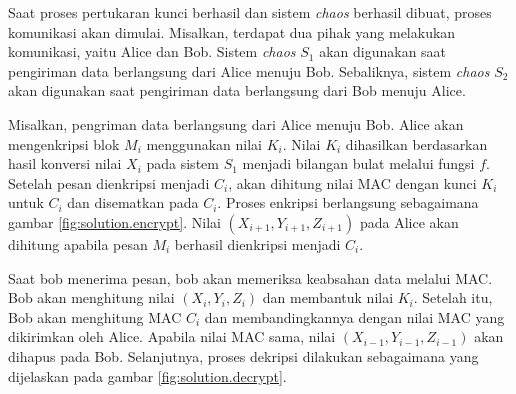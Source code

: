 Saat proses pertukaran kunci berhasil dan sistem \emph{chaos} berhasil dibuat, proses komunikasi akan dimulai. Misalkan, terdapat dua pihak yang melakukan komunikasi, yaitu Alice dan Bob. Sistem \emph{chaos} $S_1$ akan digunakan saat pengiriman data berlangsung dari Alice menuju Bob.  Sebaliknya, sistem \emph{chaos} $S_2$ akan digunakan saat pengiriman data berlangsung dari Bob menuju Alice.

Misalkan, pengriman data berlangsung dari Alice menuju Bob. Alice akan mengenkripsi blok $M_i$ menggunakan nilai $K_i$. Nilai $K_i$ dihasilkan berdasarkan hasil konversi nilai $X_i$ pada sistem $S_1$ menjadi bilangan bulat melalui fungsi $f$. Setelah pesan dienkripsi menjadi $C_i$, akan dihitung nilai MAC dengan kunci $K_i$ untuk $C_i$ dan disematkan pada $C_i$. Proses enkripsi berlangsung sebagaimana gambar \ref{fig:solution.encrypt}. Nilai $(X_{i+1}, Y_{i+1}, Z_{i+1})$ pada Alice akan dihitung apabila pesan $M_i$ berhasil dienkripsi menjadi $C_i$.  

Saat bob menerima pesan, bob akan memeriksa keabsahan data melalui MAC. Bob akan menghitung nilai $(X_i, Y_i, Z_i)$ dan membantuk nilai $K_i$. Setelah itu, Bob akan menghitung MAC $C_i$ dan membandingkannya dengan nilai MAC yang dikirimkan oleh Alice. Apabila nilai MAC sama, nilai $(X_{i-1}, Y_{i-1}, Z_{i-1})$ akan dihapus pada Bob. Selanjutnya, proses dekripsi dilakukan sebagaimana yang dijelaskan pada gambar \ref{fig:solution.decrypt}.

